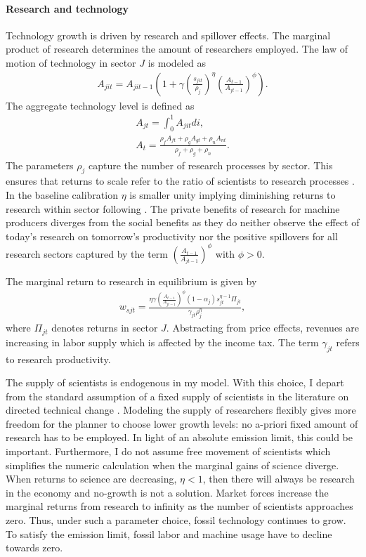 \paragraph{Research and technology}
Technology growth is driven by research and spillover effects. The marginal product of research determines the amount of researchers employed.
The law of motion of technology in sector $J$ is modeled as
\begin{align}
A_{jit}=A_{jit-1}\left(1+\gamma\left(\frac{s_{jit}}{\rho_j}\right)^\eta\left(\frac{A_{t-1}}{A_{jt-1}}\right)^\phi\right).
\end{align}
The aggregate technology level is defined as
\begin{align}
A_{jt}=\int_{0}^{1}A_{jit}di,\\
A_{t}=\frac{\rho_fA_{ft}+\rho_gA_{gt}+\rho_n A_{nt}}{\rho_f+\rho_g+\rho_n}.
\end{align}
The parameters $\rho_j$ capture the number of research processes by sector. This ensures that returns to scale refer to the ratio of scientists to research processes \citep{Fried2018ClimateAnalysis}. In the baseline calibration $\eta$ is smaller unity implying diminishing returns to research within sector following \cite{Fried2018ClimateAnalysis}. 
The private benefits of research for machine producers diverges from the social benefits as they do neither observe the effect of today's research on tomorrow's productivity nor the positive spillovers for all research sectors captured by the term $\left(\frac{A_{t-1}}{A_{jt-1}}\right)^\phi$ with $\phi>0$. 

The marginal return to research in equilibrium is  given by
\begin{align}
w_{sjt}= \frac{\eta \gamma \left(\frac{A_{t-1}}{A_{jt-1}}\right)^\phi (1-\alpha_j)s_{jt}^{\eta-1}\Pi_{jt}}{\gamma_{jt}\rho_j^\eta},
\end{align}
where $\Pi_{jt}$ denotes returns in sector $J$. Abstracting from price effects, revenues are increasing in labor supply which is affected by the income tax. The term $\gamma_{jt}$ refers to research productivity.

The supply of scientists is endogenous in my model. With this choice, I depart from the standard assumption of a fixed supply of scientists in the literature on directed technical change \cite{Acemoglu2012TheChange, Fried2018ClimateAnalysis}.  Modeling the supply of researchers flexibly gives more freedom for the planner to choose lower growth levels: no a-priori fixed amount of research has to be employed. In light of an absolute emission limit, this could be important. Furthermore, I do not assume free movement of scientists which simplifies the numeric calculation when the marginal gains of science diverge. 
When returns to science are decreasing, $\eta<1$, then there will always be research in the economy and no-growth is not a solution. Market forces increase the marginal returns from research to infinity as the number of scientists approaches zero. Thus, under such a parameter choice, fossil technology continues to grow. To satisfy the emission limit, fossil labor and machine usage have to decline towards zero. 


